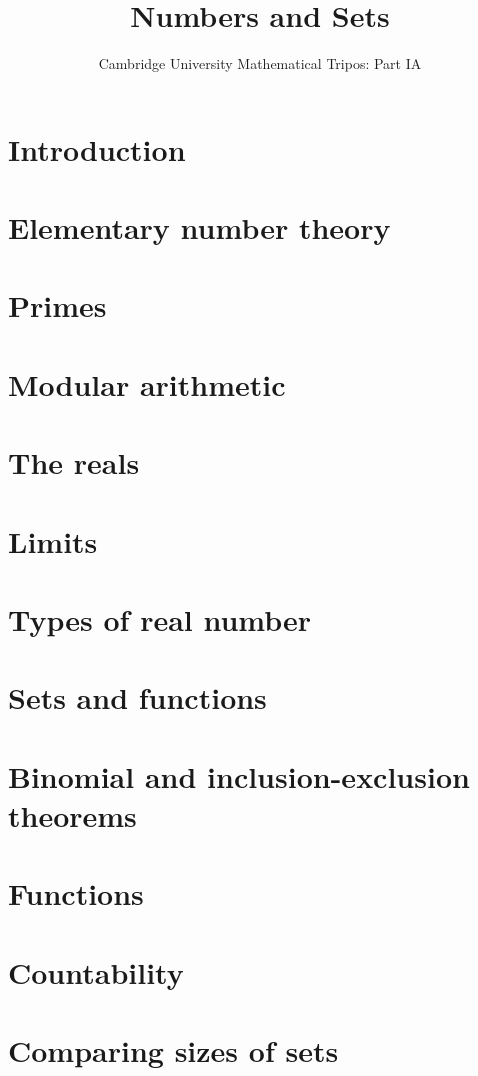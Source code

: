 \documentclass{article}
\title{Numbers and Sets}
\author{Cambridge University Mathematical Tripos: Part IA}
\begin{document}
\maketitle

\tableofcontentsnewpage{}

\section{Introduction}

\section{Elementary number theory}

\section{Primes}

\section{Modular arithmetic}

\section{The reals}

\section{Limits}

\section{Types of real number}

\section{Sets and functions}

\section{Binomial and inclusion-exclusion theorems}

\section{Functions}

\section{Countability}

\section{Comparing sizes of sets}

\end{document}
